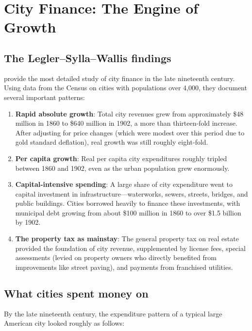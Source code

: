 \documentclass[12pt]{article}
\begin{document}
\section{City Finance: The Engine of Growth}

\subsection{The Legler--Sylla--Wallis findings}

\citet{legler_sylla_wallis1988} provide the most detailed study of city finance in the late nineteenth century.  Using data from the Census on cities with populations over 4,000, they document several important patterns:

\begin{enumerate}
    \item \textbf{Rapid absolute growth}: Total city revenues grew from approximately \$48 million in 1860 to \$640 million in 1902, a more than thirteen-fold increase.  After adjusting for price changes (which were modest over this period due to gold standard deflation), real growth was still roughly eight-fold.

    \item \textbf{Per capita growth}: Real per capita city expenditures roughly tripled between 1860 and 1902, even as the urban population grew enormously.

    \item \textbf{Capital-intensive spending}: A large share of city expenditure went to capital investment in infrastructure---waterworks, sewers, streets, bridges, and public buildings.  Cities borrowed heavily to finance these investments, with municipal debt growing from about \$100 million in 1860 to over \$1.5 billion by 1902.

    \item \textbf{The property tax as mainstay}: The general property tax on real estate provided the foundation of city revenue, supplemented by license fees, special assessments (levied on property owners who directly benefited from improvements like street paving), and payments from franchised utilities.
\end{enumerate}

\subsection{What cities spent money on}

By the late nineteenth century, the expenditure pattern of a typical large American city looked roughly as follows:
\end{document}
